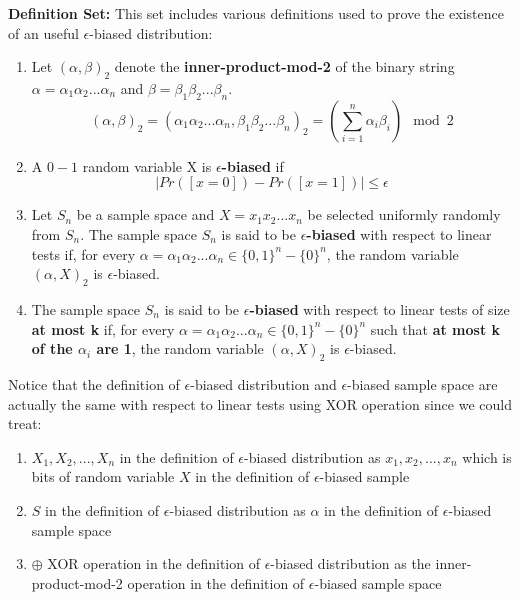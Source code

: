 \documentclass[a4paper, english]{paper}
\begin{document}
	\noindent\textbf{Definition Set:} This set includes various definitions used to prove the existence of an useful $\epsilon$-biased distribution:
	\begin{enumerate}
	\item Let $(\alpha,\beta)_2$ denote the \textbf{inner-product-mod-2} of the binary string $\alpha=\alpha_1\alpha_2...\alpha_n$ and $\beta=\beta_1\beta_2...\beta_n$.
	$$(\alpha,\beta)_2 =(\alpha_1\alpha_2...\alpha_n,\beta_1\beta_2...\beta_n)_2= (\sum_{i=1}^n \alpha_i\beta_i) \mod 2$$
	\item A $0-1$ random variable X is \textbf{$\epsilon$-biased} if
		$$|Pr([x=0])-Pr([x=1])|\le \epsilon$$
	\item Let $S_n$ be a sample space and $X=x_1x_2...x_n$ be selected uniformly randomly from $S_n$. The sample space $S_n$ is said to be \textbf{$\epsilon$-biased} with respect to linear tests if, for every $\alpha=\alpha_1\alpha_2...\alpha_n\in\{0,1\}^n-\{0\}^n$, the random variable $(\alpha,X)_2$ is $\epsilon$-biased.
	\item The sample space $S_n$ is said to be \textbf{$\epsilon$-biased} with respect to linear tests of size \textbf{at most k} if, for every $\alpha=\alpha_1\alpha_2...\alpha_n\in\{0,1\}^n-\{0\}^n$ such that \textbf{at most k of the $\alpha_i$ are 1}, the random variable $(\alpha,X)_2$ is $\epsilon$-biased.
	\end{enumerate}
\quad	Notice that the definition of $\epsilon$-biased distribution and $\epsilon$-biased sample space are actually the same with respect to linear tests using XOR operation since we could treat:
	\begin{enumerate}
		\item $X_1,X_2,...,X_n$ in the definition of $\epsilon$-biased distribution as $x_1,x_2,...,x_n$ which is bits of random variable $X$ in the definition of $\epsilon$-biased sample
		\item $S$  in the definition of $\epsilon$-biased distribution as $\alpha$ in the definition of $\epsilon$-biased sample space
		\item $\oplus$ XOR operation in the definition of $\epsilon$-biased distribution as the inner-product-mod-2 operation in the definition of $\epsilon$-biased sample space
	\end{enumerate}
	
\end{document}

